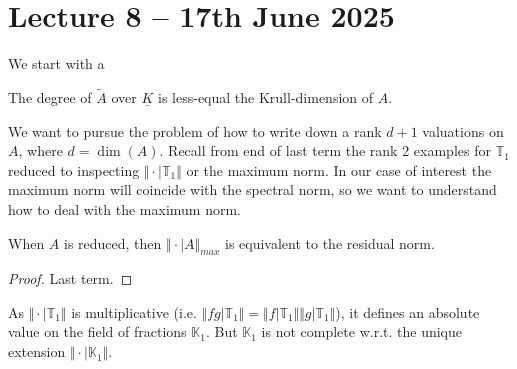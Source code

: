 \section{Lecture 8 -- 17th June 2025}\label{sec: lecture 8}
We start with a 
\begin{remark}
The degree of $\tilde{A}$ over $\underline{K}$ is less-equal the Krull-dimension
of $A$.
\end{remark}
We want to pursue the problem of how to write down a rank $d+1$ valuations
on $A$, where $d=\dim(A)$. Recall from end of last term the rank 2 examples
for $\mathbb{T}_1$ reduced to inspecting $\Vert\cdot|\mathbb{T}_1\Vert$ 
or the maximum norm. In our case of interest the maximum norm will
coincide with the spectral norm, so we want to understand how to
deal with the maximum norm.
\begin{proposition}
When $A$ is reduced, then $\Vert\cdot|A\Vert_{max}$ is equivalent to the
residual norm.
\end{proposition}
\begin{proof}
Last term.
\end{proof}
As $\Vert\cdot|\mathbb{T}_1\Vert$ is multiplicative (i.e. 
$\Vert fg|\mathbb{T}_1\Vert=\Vert f|\mathbb{T}_1\Vert\Vert g|\mathbb{T}_1\Vert$),
it defines an absolute value on the field of fractions $\mathbb{K}_1$.
But $\mathbb{K}_1$ is not complete w.r.t. the unique extension
$\Vert\cdot|\mathbb{K}_1\Vert$.

